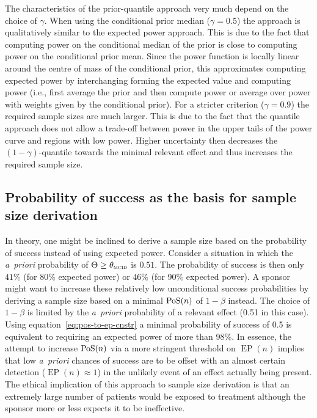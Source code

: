 \documentclass{article}
\newcommand{\EP}{\operatorname{EP}}
\begin{document}
The characteristics of the prior-quantile approach
very much depend on the choice of $\gamma$.
When using the conditional prior median ($\gamma=0.5$) the approach is qualitatively similar to the expected power approach.
This is due to the fact that computing power on the conditional median of the prior is close to computing power on the conditional prior mean.
Since the power function is locally linear around the centre of mass of the conditional prior, this approximates computing expected power by interchanging forming the expected value and computing power (i.e., first average the prior and then compute power or average over power with weights given by the conditional prior).
For a stricter criterion ($\gamma=0.9$) the required
sample sizes are much larger.
This is due to the fact that the quantile approach
does not allow a trade-off between power in the upper tails of the power curve and regions with low power. Higher uncertainty then decreases the $(1-\gamma)$-quantile towards the minimal relevant effect and thus increases the required sample size.



\subsection{Probability of success as the basis for sample size derivation}
\label{sec:results:pos-for-sample-size-determination}

In theory, one might be inclined to derive a sample size based on the probability of success instead of using expected power.
Consider a situation in which the \textit{a~priori} probability of $\Theta \geq \mcid$ is $0.51$.
The probability of success is then only $41\%$ (for 80\% expected power) or $46\%$ (for 90\% expected power).
A sponsor might want to increase these relatively low unconditional success probabilities by deriving a sample size based on a minimal $\operatorname{PoS}(n)$ of $1-\beta$ instead.
The choice of $1-\beta$ is limited by the \textit{a~priori}
probability of a relevant effect (0.51 in this case).
Using equation~\eqref{eq:pos-to-ep-cnstr} a minimal probability of success of 0.5 is equivalent to requiring an expected power of more than 98\%.
In essence, the attempt to increase $\operatorname{PoS}(n)$ via a more stringent threshold on $\EP(n)$ implies that low \textit{a~priori} chances of success are to be offset with an almost certain detection ($\EP(n)\approx 1$) in the unlikely event of an effect actually being present.
The ethical implication of this approach to sample size derivation is that an extremely large number of patients would be exposed to treatment although the sponsor more or less expects it to be ineffective.
\end{document}
